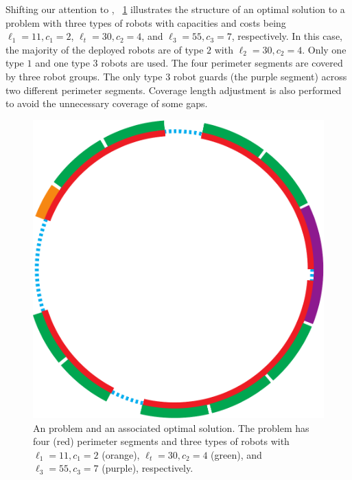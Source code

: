 Shifting our attention to \opgmc, ~\ref{fig:opgext-opgmc} illustrates the 
structure of an optimal solution to a problem with three types of robots 
with capacities and costs being $\ell_1=11, c_1=2$, $\ell_t=30, 
c_2=4$, and $\ell_3=55, c_3=7$, respectively. In this case, the majority 
of the deployed robots are of type $2$ with $\ell_2=30, c_2=4$. Only one 
type $1$ and one type $3$ robots are used. The four perimeter segments are 
covered by three robot groups. 
%
%
The only type $3$ robot guards (the purple segment) across two different 
perimeter segments. Coverage length adjustment is also performed to avoid 
the unnecessary coverage of some gaps. 

\begin{figure}[!ht]
    \centering
    \includegraphics[scale = 0.4]{chapters/opg-ext/figures/opgmc-new-t-eps-converted-to.pdf}
    \caption{An \opgmc problem and an associated optimal solution. The 
		problem has four (red) perimeter segments and three types of robots
		with $\ell_1=11, c_1=2$ (orange), $\ell_t=30, c_2=4$ (green), 
		and $\ell_3=55, c_3=7$ (purple), respectively.}
		\label{fig:opgext-opgmc}
\end{figure}

